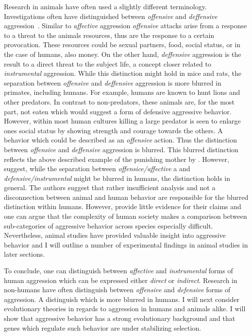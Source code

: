 Research in animals have often used a slightly different terminology.
Investigations often have distinguished between \textit{offensive} and \textit{deffensive} aggression~\cite{Blanchard2005b}.
Similar to \textit{affective} aggression \textit{offensive} attacks arise from a response to a threat to the animals resources, thus are the response to a certain provocation.
These resources could be sexual partners, food, social status, or in the case of humans, also money.
On the other hand, \textit{deffensive} aggression is the result to a direct threat to the subject life, a concept closer related to \textit{instrumental} aggression.
While this distinction might hold in mice and rats, the separation between \textit{offensive} and \textit{deffensive} aggression is more blurred in primates, including humans.
For example, humans are known to hunt lions and other predators.
In contrast to non-predators, these animals are, for the most part, not eaten which would suggest a form of defensive aggressive behavior.
However, within most human cultures killing a large predator is seen to enlarge ones social status by showing strength and courage towards the others.
A behavior which could be described as an \textit{offensive} action.
Thus the distinction between \textit{offensive} and \textit{deffensive} aggression is blurred.
This blurred distinction reflects the above described example of the punishing mother by \citet{Geen2001}.
However, \citet{Blanchard2005b} suggest, while the separation between \textit{offensice/affective} a and \textit{defensive/instrumental} might be blurred in humans, the distinction holds in general.
The authors suggest that rather insufficient analysis and not a disconnection between animal and human behavior are responsible for the blurred distinction within humans.
However, \citet{Blanchard2005b} provide little evidence for their claims and one can argue that the complexity of human society makes a comparison between sub-categories of aggressive behavior across species especially difficult. 
Nevertheless, animal studies have provided valuable insight into aggressive behavior and I will outline a number of experimental findings in animal studies in later sections.

To conclude, one can distinguish between \textit{affective} and \textit{instrumental} forms of human aggression which can be expressed either \textit{direct} or \textit{indirect}.
Research in non-humans have often distinguish between \textit{offensive} and \textit{defensive} forms of aggression.
A distinguish which is more blurred in humans.
I will next consider evolutionary theories in regards to aggression in humans and animals alike.
I will show that aggressive behavior has a strong evolutionary background and that genes which regulate such behavior are under stabilizing selection.

